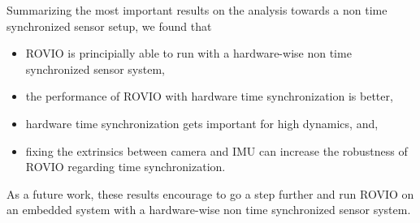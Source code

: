 Summarizing the most important results on the analysis towards a non time synchronized sensor setup, we found that

\begin{itemize}
\item ROVIO is principially able to run with a hardware-wise non time synchronized sensor system,
\item the performance of ROVIO with hardware time synchronization is better,
\item hardware time synchronization gets important for high dynamics, and,
\item fixing the extrinsics between camera and IMU can increase the robustness of ROVIO regarding time synchronization.
\end{itemize}

As a future work, these results encourage to go a step further and run ROVIO on an embedded system with a hardware-wise non time synchronized sensor system.













